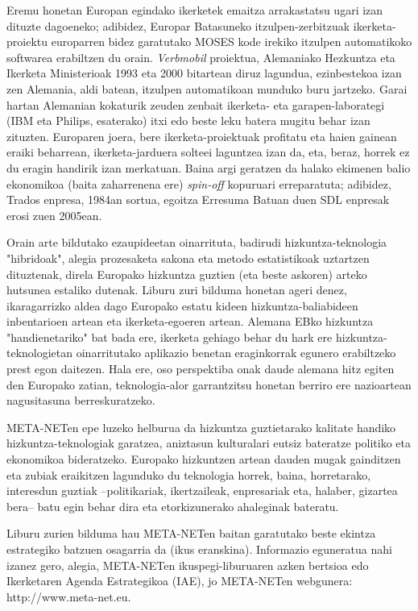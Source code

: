 \begin{multicols}{2}
    Eremu honetan Europan egindako ikerketek emaitza arrakastatsu ugari izan dituzte dagoeneko; adibidez, Europar Batasuneko itzulpen-zerbitzuak ikerketa-proiektu europarren bidez garatutako MOSES kode irekiko itzulpen automatikoko softwarea erabiltzen du orain. \textit{Verbmobil} proiektua, Alemaniako Hezkuntza eta Ikerketa Ministerioak 1993 eta 2000 bitartean diruz lagundua, ezinbestekoa izan zen Alemania, aldi batean, itzulpen automatikoan munduko buru jartzeko. Garai hartan Alemanian kokaturik zeuden zenbait ikerketa- eta garapen-laborategi (IBM eta Philips, esaterako) itxi edo beste leku batera mugitu behar izan zituzten. Europaren joera, bere ikerketa-proiektuak profitatu eta haien gainean eraiki beharrean, ikerketa-jarduera solteei laguntzea izan da, eta, beraz, horrek ez du eragin handirik izan merkatuan. Baina argi geratzen da halako ekimenen balio ekonomikoa (baita zaharrenena ere) \textit{spin-off} kopuruari erreparatuta; adibidez, Trados enpresa, 1984an sortua, egoitza Erresuma Batuan duen SDL enpresak erosi zuen 2005ean.


Orain arte bildutako ezaupideetan oinarrituta, badirudi hizkuntza-teknologia "hibridoak", alegia prozesaketa sakona eta metodo estatistikoak uztartzen dituztenak, direla Europako hizkuntza guztien (eta beste askoren) arteko hutsunea estaliko dutenak. Liburu zuri bilduma honetan ageri denez, ikaragarrizko aldea dago Europako estatu kideen hizkuntza-baliabideen inbentarioen artean eta ikerketa-egoeren artean. Alemana EBko hizkuntza "handienetariko" bat bada ere, ikerketa gehiago behar du hark ere hizkuntza-teknologietan oinarritutako aplikazio benetan eraginkorrak egunero erabiltzeko prest egon daitezen. Hala ere, oso perspektiba onak daude alemana hitz egiten den Europako zatian, teknologia-alor garrantzitsu honetan berriro ere nazioartean nagusitasuna berreskuratzeko.

    META-NETen epe luzeko helburua da hizkuntza guztietarako kalitate handiko hizkuntza-teknologiak garatzea, aniztasun kulturalari eutsiz bateratze politiko eta ekonomikoa bideratzeko. Europako hizkuntzen artean dauden mugak gainditzen eta zubiak eraikitzen lagunduko du teknologia horrek, baina, horretarako, interesdun guztiak –politikariak, ikertzaileak, enpresariak eta, halaber, gizartea bera– batu egin behar dira eta etorkizunerako ahaleginak bateratu.

    Liburu zurien bilduma hau META-NETen baitan garatutako beste ekintza estrategiko batzuen osagarria da (ikus eranskina). Informazio eguneratua nahi izanez gero, alegia, META-NETen ikuspegi-liburuaren azken bertsioa \cite{Meta1} edo Ikerketaren Agenda Estrategikoa (IAE), jo META-NETen webgunera: http://www.meta-net.eu.
\end{multicols}

